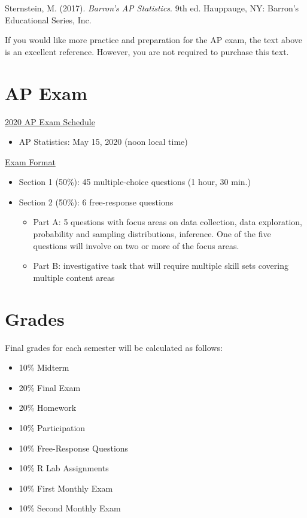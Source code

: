 \documentclass[12pt,fleqn]{article}
\providecommand{\tightlist}{%
  \setlength{\itemsep}{0pt}\setlength{\parskip}{0pt}}
\begin{document}
Sternstein, M. (2017). \emph{Barron's AP Statistics}. 9th ed.
Hauppauge, NY: Barron's Educational Series, Inc.

If you would like more practice and preparation for the AP exam, the text above is an excellent reference. However, you are not required to purchase this text.

\hypertarget{ap-exam}{%
\section{AP Exam}\label{ap-exam}}

\href{https://apcentral.collegeboard.org/courses/exam-dates-and-fees/exam-dates-2020}{2020 AP Exam Schedule}

\begin{itemize}
\tightlist
\item
  AP Statistics: May 15, 2020 (noon local time)
\end{itemize}

\href{https://apcentral.collegeboard.org/courses/ap-statistics/exam}{Exam Format}

\begin{itemize}
\item
  Section 1 (50\%): 45 multiple-choice questions (1 hour, 30 min.)
\item
  Section 2 (50\%): 6 free-response questions

  \begin{itemize}
  \tightlist
  \item
    Part A: 5 questions with focus areas on data collection, data exploration, probability and sampling distributions, inference. One of the five questions will involve on two or more of the focus areas.
  \item
    Part B: investigative task that will require multiple skill sets covering multiple content areas
  \end{itemize}
\end{itemize}

\hypertarget{grades}{%
\section{Grades}\label{grades}}

Final grades for each semester will be calculated as follows:

\begin{itemize}
\tightlist
\item
  10\% Midterm
\item
  20\% Final Exam
\item
  20\% Homework
\item
  10\% Participation
\item
  10\% Free-Response Questions
\item
  10\% R Lab Assignments
\item
  10\% First Monthly Exam
\item
  10\% Second Monthly Exam
\end{itemize}
\end{document}
